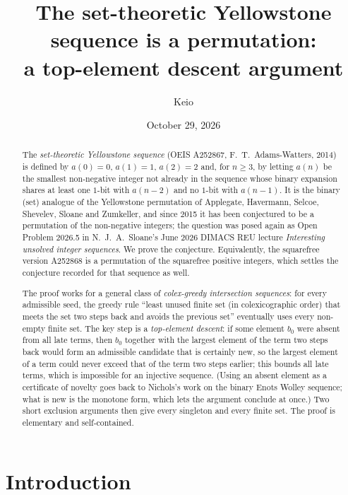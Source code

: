 \documentclass[11pt]{amsart}
\title[The set-theoretic Yellowstone sequence is a permutation]{The set-theoretic Yellowstone
sequence is a permutation:\\ a top-element descent argument}
\author{Keio}
\date{October 29, 2026}
\theoremstyle{definition}
\theoremstyle{remark}
\begin{document}
\begin{abstract}
The \emph{set-theoretic Yellowstone sequence} (OEIS A252867, F.~T.~Adams-Watters, 2014) is
defined by $a(0)=0$, $a(1)=1$, $a(2)=2$ and, for $n\ge3$, by letting $a(n)$ be the smallest
non-negative integer not already in the sequence whose binary expansion shares at least one
$1$-bit with $a(n-2)$ and no $1$-bit with $a(n-1)$. It is the binary (set) analogue of the
Yellowstone permutation of Applegate, Havermann, Selcoe, Shevelev, Sloane and Zumkeller, and
since 2015 it has been conjectured to be a permutation of the non-negative integers; the
question was posed again as Open Problem 2026.5 in N.~J.~A.~Sloane's June 2026 DIMACS REU
lecture \emph{Interesting unsolved integer sequences}. We prove the conjecture. Equivalently, the squarefree version A252868 is
a permutation of the squarefree positive integers, which settles the conjecture recorded for
that sequence as well.

The proof works for a general class of \emph{colex-greedy intersection sequences}: for every
admissible seed, the greedy rule ``least unused finite set (in colexicographic order) that meets
the set two steps back and avoids the previous set'' eventually uses every non-empty finite set.
The key step is a \emph{top-element descent}: if some element $b_0$ were absent from all late
terms, then $b_0$ together with the largest element of the term two steps back would form an
admissible candidate that is certainly new, so the largest element of a term could never exceed
that of the term two steps earlier; this bounds all late terms, which is impossible for an
injective sequence. (Using an absent element as a certificate of novelty goes back to Nichols's
work on the binary Enots Wolley sequence; what is new is the monotone form, which lets the
argument conclude at once.) Two short exclusion arguments then give every singleton and every finite set.
The proof is elementary and self-contained.
\end{abstract}

\maketitle

\section{Introduction}\label{sec:intro}
\end{document}
